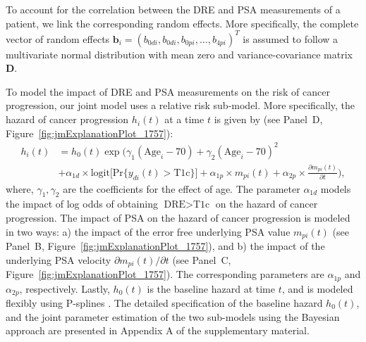 To account for the correlation between the DRE and PSA measurements of a patient, we link the corresponding random effects. More specifically, the complete vector of random effects ${\boldsymbol{b}_i = (b_{0di}, b_{0di}, b_{0pi}, \ldots, b_{4pi})^T}$ is assumed to follow a multivariate normal distribution with mean zero and variance-covariance matrix $\boldsymbol{D}$.

To model the impact of DRE and PSA measurements on the risk of cancer progression, our joint model uses a relative risk sub-model. More specifically, the hazard of cancer progression $h_i(t)$ at a time $t$ is given by (see Panel~D, Figure~\ref{fig:jmExplanationPlot_1757}):
\begin{equation}
\label{eq:rel_risk_model}
\begin{split}
    h_i(t) &= h_0(t) \exp\Big(\gamma_1 (\mbox{Age}_i-70) + \gamma_2 (\mbox{Age}_i-70)^2\\
    &+\alpha_{1d} \times \mbox{logit} \big[\mbox{Pr}\{y_{di}(t) > \mbox{T1c}\}\big]+ \alpha_{1p} \times m_{pi}(t) + \alpha_{2p} \times \frac{\partial m_{pi}(t)}{\partial {t}}\Big),
    \end{split}
\end{equation}
where, $\gamma_1, \gamma_2$ are the coefficients for the effect of age. The parameter $\alpha_{1d}$ models the impact of log odds of obtaining $\mbox{DRE} > \mbox{T1c}$ on the hazard of cancer progression. The impact of PSA on the hazard of cancer progression is modeled in two ways: a) the impact of the error free underlying PSA value $m_{pi}(t)$ (see Panel~B, Figure~\ref{fig:jmExplanationPlot_1757}), and b) the impact of the underlying PSA velocity $\partial m_{pi}(t)/\partial {t}$ (see Panel~C, Figure~\ref{fig:jmExplanationPlot_1757}). The corresponding parameters are $\alpha_{1p}$ and $\alpha_{2p}$, respectively. Lastly, $h_0(t)$ is the baseline hazard at time $t$, and is modeled flexibly using P-splines \citep{eilers1996flexible}. The detailed specification of the baseline hazard $h_0(t)$, and the joint parameter estimation of the two sub-models using the Bayesian approach are presented in Appendix A of the supplementary material.

